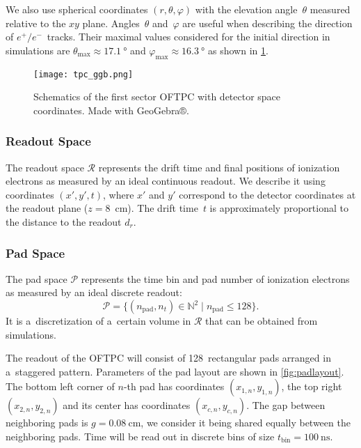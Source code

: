 				We also use spherical coordinates $(r,\theta,\varphi)$ with the elevation angle~$\theta$ measured relative to the $xy$ plane. Angles~$\theta$ and~$\varphi$ are useful when describing the direction of $e^+/e^-$~tracks. Their maximal values considered for the initial direction in simulations are $\theta_\text{max} \approx \qty{17.1}{\degree}$ and $\varphi_\text{max} \approx \qty{16.3}{\degree}$ as shown in \cref{fig:oftpc}.
				
				\begin{figure}
					\centering
					\texttt{[image: tpc\_ggb.png]}
					\caption{Schematics of the first sector \ac{OFTPC} with detector space coordinates. Made with GeoGebra®.}
					\label{fig:oftpc}
				\end{figure}
			
			\subsubsection{Readout Space}
				The readout space $\mathcal{R}$ represents the drift time and final positions of ionization electrons as measured by an ideal continuous readout. We describe it using coordinates $(x',y',t)$, where $x'$ and $y'$ correspond to the detector coordinates at the readout plane ($z = 8$~cm). The drift time~$t$ is approximately proportional to the distance to the readout $d_r$.
			
			\subsubsection{Pad Space}
				The pad space $\mathcal{P}$ represents the time bin and pad number of ionization electrons as measured by an ideal discrete readout:
					\begin{equation}
						\mathcal{P} = \{(n_\text{pad},n_t)\in\mathbb{N}^2 \mid n_\text{pad}\leq128\}.
					\end{equation}
				It is a~discretization of a~certain volume in $\mathcal{R}$ that can be obtained from simulations.
				
				The readout of the \ac{OFTPC} will consist of 128~rectangular pads arranged in a~staggered pattern. Parameters of the pad layout are shown in \cref{fig:padlayout}. The bottom left corner of $n$\nobreakdash-th pad has coordinates $(x_{1,n},y_{1,n})$, the top right $(x_{2,n},y_{2,n})$ and its center has coordinates $(x_{c,n},y_{c,n})$. The gap between neighboring pads is $g=\qty{0.08}{\cm}$, we consider it being shared equally between the neighboring pads. Time will be read out in discrete bins of size $t_\text{bin}=\qty{100}{\ns}$.
			
